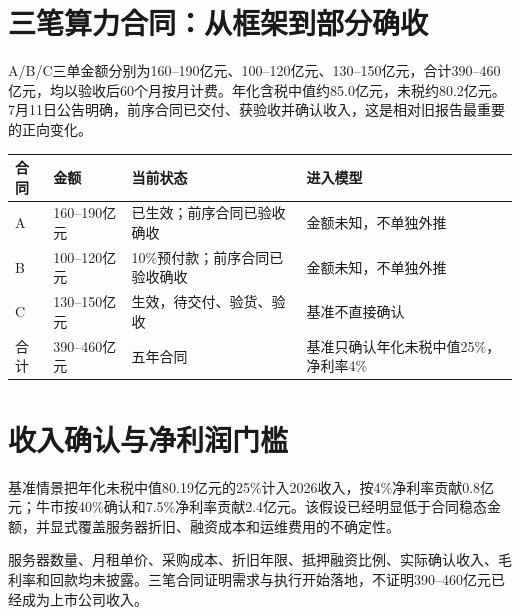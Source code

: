 \section{三笔算力合同：从框架到部分确收}

A/B/C三单金额分别为160--190亿元、100--120亿元、130--150亿元，合计390--460亿元，均以验收后60个月按月计费。年化含税中值约85.0亿元，未税约80.2亿元。7月11日公告明确，前序合同已交付、获验收并确认收入，这是相对旧报告最重要的正向变化。

\begin{exhibitbox}[合同到盈利桥]
\noindent\begin{tabularx}{\textwidth}{L{1.5cm}R{1.8cm}L{2.1cm}X}
\toprule
\textbf{合同} & \textbf{金额} & \textbf{当前状态} & \textbf{进入模型} \\
\midrule
A & 160--190亿元 & 已生效；前序合同已验收确收 & 金额未知，不单独外推 \\
B & 100--120亿元 & 10\%预付款；前序合同已验收确收 & 金额未知，不单独外推 \\
C & 130--150亿元 & 生效，待交付、验货、验收 & 基准不直接确认 \\
合计 & 390--460亿元 & 五年合同 & 基准只确认年化未税中值25\%，净利率4\% \\
\bottomrule
\end{tabularx}
\end{exhibitbox}

\section{收入确认与净利润门槛}

基准情景把年化未税中值80.19亿元的25\%计入2026收入，按4\%净利率贡献0.8亿元；牛市按40\%确认和7.5\%净利率贡献2.4亿元。该假设已经明显低于合同稳态金额，并显式覆盖服务器折旧、融资成本和运维费用的不确定性。

\begin{riskbox}[不能把订单额直接当利润]
服务器数量、月租单价、采购成本、折旧年限、抵押融资比例、实际确认收入、毛利率和回款均未披露。三笔合同证明需求与执行开始落地，不证明390--460亿元已经成为上市公司收入。
\end{riskbox}
